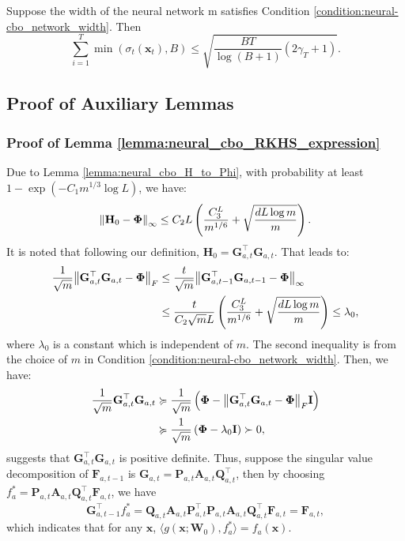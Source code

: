 \begin{auxlemma}
\label{lemma:neural_cbo_min_sigma}
Suppose the width of the neural network m satisfies Condition \ref{condition:neural-cbo_network_width}. Then 
\begin{equation*}
    \sum_{i=1}^T \min(\sigma_t(\mathbf{x}_t),B) \leq \sqrt{\frac{ BT}{\log(B+1)} (2\gamma_T+1)}.
\end{equation*}
\end{auxlemma}

\subsection{Proof of Auxiliary Lemmas}
\label{section:neural-cbo_aux_proofs}
\subsubsection{Proof of Lemma \ref{lemma:neural_cbo_RKHS_expression}}

    Due to Lemma \ref{lemma:neural_cbo_H_to_Phi}, with probability at least $1 - \exp (-C_1 m^{1/3} \log L)$, we have:
    \[
    \norm{\mathbf{H}_0 - \boldsymbol{\Phi}}_\infty \le C_2 L \left(\frac{C_3^L}{m^{1/6}} + \sqrt{\frac{dL\log m}{m}}\right).
    \] 
    It is noted that following our definition,  $\mathbf{H}_0 = \mathbf{G}_{a,t} ^\top \mathbf{G}_{a,t}$. That leads to:
    \begin{align*}
        \frac{1}{\sqrt{m}}\norm{\mathbf{G}_{a,t} ^\top \mathbf{G}_{a,t} - \boldsymbol{\Phi}}_F & \le \frac{t}{\sqrt{m}} \norm{\mathbf{G}_{a,t-1} ^\top \mathbf{G}_{a,t-1} - \boldsymbol{\Phi}}_\infty 
        \\
        & \le \frac{t}{C_2 \sqrt{m} L} \left(\frac{C_3^L}{m^{1/6}} + \sqrt{\frac{dL\log m}{m}}\right)  \le \lambda_0,
    \end{align*}
    where $\lambda_0$ is a constant which is independent of $m$. The second inequality is from the choice of $m$ in Condition \ref{condition:neural-cbo_network_width}. 
    Then, we have:
    \begin{align*}
        \frac{1}{\sqrt{m}}\mathbf{G}_{a,t} ^\top \mathbf{G}_{a,t} & \succcurlyeq  \frac{1}{\sqrt{m}} \left(\boldsymbol{\Phi} - 
        \norm{\mathbf{G}_{a,t} ^\top \mathbf{G}_{a,t} - \boldsymbol{\Phi}}_F \mathbf{I} \right)
        \\
        & \succcurlyeq \frac{1}{\sqrt{m}} \left(\boldsymbol{\Phi} - 
        \lambda_0 \mathbf{I} \right) \succ 0, 
    \end{align*}
    suggests that $\mathbf{G}_{a,t} ^\top \mathbf{G}_{a,t}$ is positive definite.  Thus, suppose the singular value decomposition of $\mathbf{F}_{a,t-1}$ is $\mathbf{G}_{a,t} = \mathbf{P}_{a,t} \mathbf{A}_{a,t} \mathbf{Q}_{a,t}^\top$, then by choosing $f_a^* = \mathbf{P}_{a,t} \mathbf{A}_{a,t} \mathbf{Q}_{a,t}^\top \mathbf{F}_{a,t}$, we have
    \[
    \mathbf{G}_{a,t-1}^\top f_a^* =  \mathbf{Q}_{a,t} \mathbf{A}_{a,t} \mathbf{P}_{a,t}^\top \mathbf{P}_{a,t} \mathbf{A}_{a,t} \mathbf{Q}_{a,t}^\top \mathbf{F}_{a,t}  = \mathbf{F}_{a,t}, 
    \]
    which indicates that for any $\mathbf{x}$, $\langle g(\mathbf{x}; \mathbf{W}_0), f_a^*\rangle = f_a(\mathbf{x})$.

